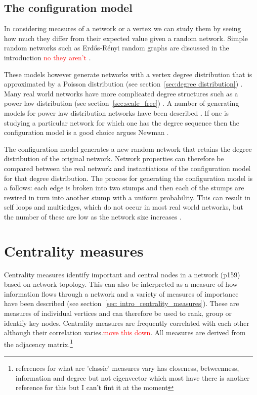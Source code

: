 \subsection{The configuration model}
\label{sec:configuration model}
In considering measures of  a network or a vertex we can study them by seeing how much they differ from their expected value given a random network. Simple random networks such as Erd\H{o}s-R\'enyi random graphs are discussed in the introduction \textcolor{red}{no they aren't} .

These models however generate networks with a vertex degree distribution that is approximated by  a Poisson distribution (see section~\ref{sec:degree distribution}) . Many real world networks have more complicated degree structures such as a power law distribution (see section~\ref{sec:scale_free}) . A number of generating models for power law distribution networks have been described . If one is studying a particular network for which one has the degree sequence then the configuration model is a good choice argues Newman . \cite{newman2018networks}

The configuration model generates a new random network that retains the degree distribution of the original network. Network properties can therefore be compared between the real network and instantiations of the configuration model for that degree distribution. The process for generating the configuration model is a follows: each edge is broken into two stumps and then each of the stumps are rewired in turn into another stump with a uniform probability. This can result in self loops and multiedges, which do not occur in most real world networks, but the number of these are low as the network size increases \cite{newman2018networks}.




\section{Centrality measures}
\label{sec:centrality measures}
Centrality measures identify important and central nodes in a network \cite{newman2018networks}(p159) based on network topology. This can also be interpreted as a measure of how information flows through a network \cite{borgatti2005centrality} and a variety of measures of importance have been described (see section~\ref{sec: intro_centrality_measures}). These are measures of individual vertices and can therefore be used to rank, group or identify key nodes. Centrality measures are frequently correlated with each other \cite{valente2008correlated} although their correlation varies.\textcolor{red}{move this down}. All measures are derived from the adjacency matrix.\footnote{references for what are 'classic' measures vary \cite{cadini2008using} has closeness, betweenness, information and degree but not eigenvector which most have there is another reference for this but I can't fint it at the moment}



